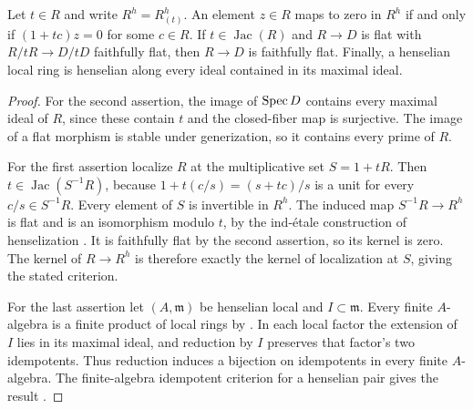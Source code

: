 \begin{lemma}
\label{A:fpqc-hensel-kernel}
Let $t\in R$ and write $R^h=R^h_{(t)}$.
An element $z\in R$ maps to zero in $R^h$ if and only if
$(1+tc)z=0$ for some $c\in R$.
If $t\in\operatorname{Jac}(R)$ and $R\to D$ is flat with
$R/tR\to D/tD$ faithfully flat, then $R\to D$ is faithfully flat.
Finally, a henselian local ring is henselian along every ideal
contained in its maximal ideal.
\end{lemma}
\begin{proof}
For the second assertion, the image of $\operatorname{Spec} D$ contains every
maximal ideal of $R$, since these contain $t$ and the closed-fiber
map is surjective.  The image of a flat morphism is stable under
generization, so it contains every prime of $R$.

For the first assertion localize $R$ at the multiplicative set
$S=1+tR$.  Then $t\in\operatorname{Jac}(S^{-1}R)$, because
$1+t(c/s)=(s+tc)/s$ is a unit for every $c/s\in S^{-1}R$.
Every element of $S$ is invertible in $R^h$.  The induced map
$S^{-1}R\to R^h$ is flat and is an isomorphism modulo $t$,
by the ind-\'etale construction of henselization
\cite[Lemmas 15.12.1--15.12.2]{StacksHenselPairs}.
It is faithfully flat by the second assertion, so its kernel is
zero.  The kernel of $R\to R^h$ is therefore exactly the kernel
of localization at $S$, giving the stated criterion.

For the last assertion let $(A,\mathfrak m)$ be henselian local
and $I\subset\mathfrak m$.  Every finite $A$-algebra is a finite
product of local rings by
\cite[Lemma 10.153.3(10)]{StacksHenselFactorSolution}.
In each local factor the extension of $I$ lies in its maximal
ideal, and reduction by $I$ preserves that factor's two
idempotents.  Thus reduction induces a bijection on idempotents
in every finite $A$-algebra.  The finite-algebra idempotent
criterion for a henselian pair gives the result
\cite[Lemma 15.11.6]{StacksHenselPairCriterionSolution}.
\end{proof}

